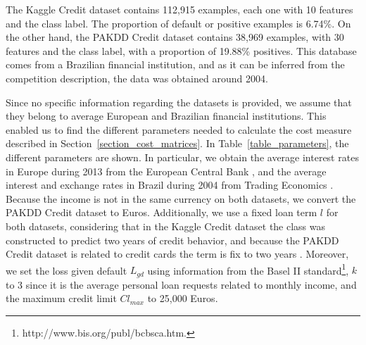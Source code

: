     The Kaggle Credit dataset contains 112,915 examples, each one with 10 features and the class 
    label. The proportion of default or positive examples is 6.74\%. 
    On the other hand, the PAKDD Credit dataset contains 38,969 examples, with 30 features and the 
    class label, with a proportion of 19.88\% positives. This database comes from a Brazilian 
    financial institution, and as it can be inferred from the competition description, the data 
    was obtained around 2004.
    
    Since no specific information regarding the datasets is provided, we assume that they belong to 
    average European and Brazilian financial institutions. This enabled us to find the different 
    parameters needed to calculate the cost measure described in 
    Section~\ref{section_cost_matrices}. In Table~\ref{table_parameters}, the different 
    parameters are shown. In particular, we obtain the average interest rates in Europe during 
    2013 from the European Central Bank \citep{ECB2014}, and the average interest and exchange 
    rates in Brazil during 2004 from Trading Economics \citep{Economics2014}. Because the income 
    is not in the same currency on both datasets, we convert the PAKDD Credit dataset to Euros.
    Additionally, we use a fixed loan term $l$ for both datasets, considering that in the Kaggle 
    Credit dataset the class was constructed to predict two years of credit behavior, and 
    because the PAKDD Credit dataset is related to credit cards the term is fix to two years 
    \citep{Lawrence2012}. Moreover, we set the loss given default $L_{gd}$ using information from 
    the Basel II standard\footnote{http://www.bis.org/publ/bcbsca.htm.}, $k$ to 3 since it is the 
    average personal loan requests related to monthly income, and the maximum credit limit 
    $Cl_{max}$ to 25,000 Euros.
